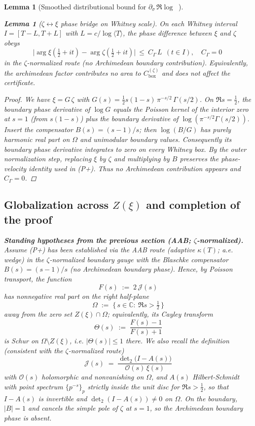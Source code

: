 \documentclass[11pt]{article}
\newtheorem{lemma}[theorem]{Lemma}
\theoremstyle{definition}
\theoremstyle{remark}
\DeclareMathOperator{\dettwo}{det_2}
\begin{document}
\begin{lemma}[Smoothed distributional bound for $\partial_\sigma\,\Re\log\dettwo$]
\begin{lemma}[$\zeta\!\leftrightarrow\!\xi$ phase bridge on Whitney scale]\label{lem:zeta-xi-bridge}
On each Whitney interval $I=[T{-}L,T{+}L]$ with $L=c/\log\langle T\rangle$, the phase difference between $\xi$ and $\zeta$ obeys
\[\textstyle
  \Big|\arg\xi(\tfrac12{+}it)-\arg\zeta(\tfrac12{+}it)\Big|\ \le\ C_\Gamma\,L\ \ (t\in I),\quad C_\Gamma=0\ 
\]
in the $\zeta$-normalized route (no Archimedean boundary contribution). Equivalently, the archimedean factor contributes no area to $C_{\mathrm{box}}^{(\zeta)}$ and does not affect the certificate.
\end{lemma}
\begin{proof}
We have $\xi=G\,\zeta$ with $G(s)=\tfrac12 s(1{-}s)\,\pi^{-s/2}\,\Gamma(s/2)$. On $\Re s=\tfrac12$, the boundary phase derivative of $\log G$ equals the Poisson kernel of the interior zero at $s=1$ (from $s(1{-}s)$) plus the boundary derivative of $\log(\pi^{-s/2}\Gamma(s/2))$. Insert the compensator $B(s)=(s{-}1)/s$; then $\log(B/G)$ has purely harmonic real part on $\Omega$ and unimodular boundary values. Consequently its boundary phase derivative integrates to zero on every Whitney box. By the outer normalization step, replacing $\xi$ by $\zeta$ and multiplying by $B$ preserves the phase-velocity identity used in (P+). Thus no Archimedean contribution appears and $C_\Gamma=0$.
\end{proof}
\subsection*{Globalization across $Z(\xi)$ and completion of the proof}
\label{subsec:globalization}


\noindent\textbf{Standing hypotheses from the previous section (AAB; $\zeta$-normalized).}
Assume (P+) has been established via the AAB route (adaptive $\kappa(T)$; a.e. wedge) in the $\zeta$-normalized boundary gauge with the Blaschke compensator $B(s)=(s-1)/s$ (no Archimedean boundary phase). Hence, by Poisson transport, the function
\[
F(s)\;:=\;2\,\mathcal J(s)
\]
has nonnegative real part on the right half-plane
\[
\Omega\;:=\;\{\,s\in\mathbb C:\ \Re s>\tfrac12\,\}
\]
away from the zero set $Z(\xi)\cap\Omega$; equivalently, its Cayley transform
\[
\Theta(s)\;:=\;\frac{F(s)-1}{F(s)+1}
\]
is Schur on $\Omega\setminus Z(\xi)$, i.e. $|\Theta(s)|\le 1$ there. We also recall the definition (consistent with the $\zeta$-normalized route)
\[
\mathcal J(s)\;=\;\frac{\det\nolimits_2\!\bigl(I-A(s)\bigr)}{\mathcal O(s)\,\xi(s)}
\]
with $\mathcal O(s)$ holomorphic and nonvanishing on $\Omega$, and $A(s)$ Hilbert-Schmidt with point spectrum $\{p^{-s}\}_{p}$ strictly inside the unit disc for $\Re s>\tfrac12$, so that $I-A(s)$ is invertible and $\det_2(I-A(s))\neq 0$ on $\Omega$. On the boundary, $|B|=1$ and cancels the simple pole of $\zeta$ at $s=1$, so the Archimedean boundary phase is absent.



\end{lemma}
\end{document}

